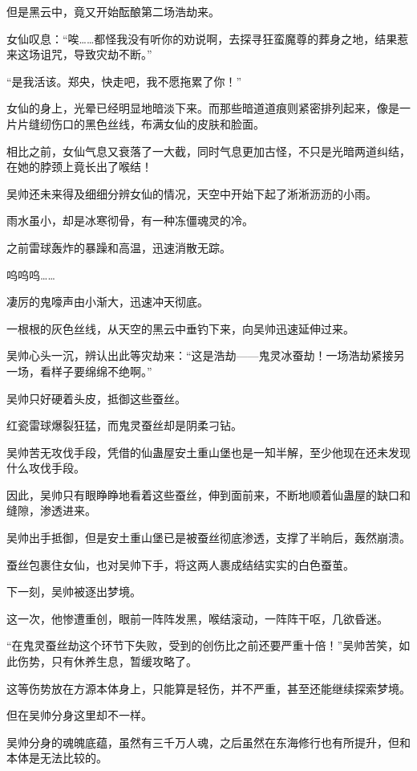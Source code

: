 \begin{this_body}
但是黑云中，竟又开始酝酿第二场浩劫来。

女仙叹息：“唉……都怪我没有听你的劝说啊，去探寻狂蛮魔尊的葬身之地，结果惹来这场诅咒，导致灾劫不断。”

“是我活该。郑央，快走吧，我不愿拖累了你！”

女仙的身上，光晕已经明显地暗淡下来。而那些暗道道痕则紧密排列起来，像是一片片缝纫伤口的黑色丝线，布满女仙的皮肤和脸面。

相比之前，女仙气息又衰落了一大截，同时气息更加古怪，不只是光暗两道纠结，在她的脖颈上竟长出了喉结！

吴帅还未来得及细细分辨女仙的情况，天空中开始下起了淅淅沥沥的小雨。

雨水虽小，却是冰寒彻骨，有一种冻僵魂灵的冷。

之前雷球轰炸的暴躁和高温，迅速消散无踪。

呜呜呜……

凄厉的鬼嚎声由小渐大，迅速冲天彻底。

一根根的灰色丝线，从天空的黑云中垂钓下来，向吴帅迅速延伸过来。

吴帅心头一沉，辨认出此等灾劫来：“这是浩劫——鬼灵冰蚕劫！一场浩劫紧接另一场，看样子要绵绵不绝啊。”

吴帅只好硬着头皮，抵御这些蚕丝。

红瓷雷球爆裂狂猛，而鬼灵蚕丝却是阴柔刁钻。

吴帅苦无攻伐手段，凭借的仙蛊屋安土重山堡也是一知半解，至少他现在还未发现什么攻伐手段。

因此，吴帅只有眼睁睁地看着这些蚕丝，伸到面前来，不断地顺着仙蛊屋的缺口和缝隙，渗透进来。

吴帅出手抵御，但是安土重山堡已是被蚕丝彻底渗透，支撑了半晌后，轰然崩溃。

蚕丝包裹住女仙，也对吴帅下手，将这两人裹成结结实实的白色蚕茧。

下一刻，吴帅被逐出梦境。

这一次，他惨遭重创，眼前一阵阵发黑，喉结滚动，一阵阵干呕，几欲昏迷。

“在鬼灵蚕丝劫这个环节下失败，受到的创伤比之前还要严重十倍！”吴帅苦笑，如此伤势，只有休养生息，暂缓攻略了。

这等伤势放在方源本体身上，只能算是轻伤，并不严重，甚至还能继续探索梦境。

但在吴帅分身这里却不一样。

吴帅分身的魂魄底蕴，虽然有三千万人魂，之后虽然在东海修行也有所提升，但和本体是无法比较的。


\end{this_body}
